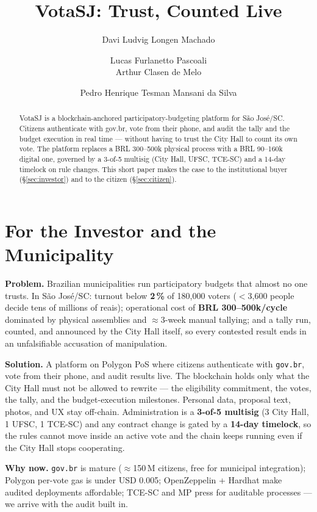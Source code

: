 \documentclass[12pt]{article}
\title{VotaSJ: Trust, Counted Live}
\author{Davi Ludvig Longen Machado\inst{1} \and
        Lucas Furlanetto Pascoali\inst{1} \\
        Arthur Clasen de Melo\inst{1} \and
        Pedro Henrique Tesman Mansani da Silva\inst{1}}
\begin{document}
\maketitle

\begin{abstract}
\noindent VotaSJ is a blockchain-anchored participatory-budgeting platform
for S\~ao Jos\'e/SC. Citizens authenticate with gov.br, vote from their
phone, and audit the tally and the budget execution in real time --- without
having to trust the City Hall to count its own vote. The platform replaces
a BRL 300--500k physical process with a BRL 90--160k digital one, governed
by a 3-of-5 multisig (City Hall, UFSC, TCE-SC) and a 14-day timelock on
rule changes. This short paper makes the case to the institutional buyer
(\S\ref{sec:investor}) and to the citizen (\S\ref{sec:citizen}).
\end{abstract}


\section*{For the Investor and the Municipality}\label{sec:investor}

\noindent\textbf{Problem.} Brazilian municipalities run participatory
budgets that almost no one trusts. In S\~ao Jos\'e/SC: turnout below
\textbf{2\,\%} of 180{,}000 voters (\(<\)3{,}600 people decide tens of
millions of reais); operational cost of \textbf{BRL 300--500k/cycle}
dominated by physical assemblies and \(\approx\)3-week manual tallying;
and a tally run, counted, and announced by the City Hall itself, so every
contested result ends in an unfalsifiable accusation of manipulation.

\noindent\textbf{Solution.} A platform on Polygon PoS where citizens
authenticate with \texttt{gov.br}, vote from their phone, and audit
results live. The blockchain holds only what the City Hall must not be
allowed to rewrite --- the eligibility commitment, the votes, the tally,
and the budget-execution milestones. Personal data, proposal text, photos,
and UX stay off-chain. Administration is a \textbf{3-of-5 multisig}
(3 City Hall, 1 UFSC, 1 TCE-SC) and any contract change is gated by a
\textbf{14-day timelock}, so the rules cannot move inside an active vote
and the chain keeps running even if the City Hall stops cooperating.

\noindent\textbf{Why now.} \texttt{gov.br} is mature (\(\approx\)150\,M
citizens, free for municipal integration); Polygon per-vote gas is under
USD 0.005; OpenZeppelin + Hardhat make audited deployments affordable;
TCE-SC and MP press for auditable processes --- we arrive with the audit
built in.
\end{document}

